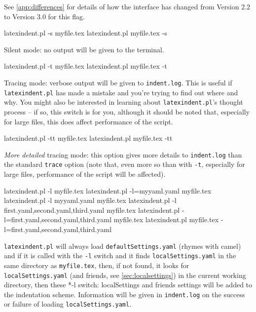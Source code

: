  See \vref{app:differences} for details of how the interface has changed from Version 2.2
 to Version 3.0 for this flag.  
 \begin{commandshell}
latexindent.pl -s myfile.tex
latexindent.pl myfile.tex -s
\end{commandshell}

 Silent mode: no output will be given to the terminal.

 \begin{commandshell}
latexindent.pl -t myfile.tex
latexindent.pl myfile.tex -t
\end{commandshell}

 \label{page:traceswitch}
 Tracing mode: verbose output will be given to \texttt{indent.log}. This is useful if
 \texttt{latexindent.pl} has made a mistake and you're trying to find out where and why.
 You might also be interested in learning about \texttt{latexindent.pl}'s thought process
 -- if so, this switch is for you, although it should be noted that, especially for large
 files, this does affect performance of the script.

 \begin{commandshell}
latexindent.pl -tt myfile.tex
latexindent.pl myfile.tex -tt
\end{commandshell}

 \emph{More detailed} tracing mode: this option gives more details to
 \texttt{indent.log}
 than the standard \texttt{trace} option (note that, even more so than with \texttt{-t},
 especially for large files, performance of the script will be affected).

 \begin{commandshell}
latexindent.pl -l myfile.tex
latexindent.pl -l=myyaml.yaml myfile.tex
latexindent.pl -l myyaml.yaml myfile.tex
latexindent.pl -l first.yaml,second.yaml,third.yaml myfile.tex
latexindent.pl -l=first.yaml,second.yaml,third.yaml myfile.tex
latexindent.pl myfile.tex -l=first.yaml,second.yaml,third.yaml 
\end{commandshell}

 \label{page:localswitch}
 \texttt{latexindent.pl} will always load \texttt{defaultSettings.yaml} (rhymes with
 camel) and if it is called with the \texttt{-l} switch and it finds
 \texttt{localSettings.yaml} in the same directory as \texttt{myfile.tex}, then, if not
 found, it looks for \texttt{localSettings.yaml} (and friends, see
 \vref{sec:localsettings}) in the current working directory, then
 these%
 *{-l switch: localSettings and
 friends} settings will be added to the indentation scheme. Information will be given in
 \texttt{indent.log} on the success or failure of loading \texttt{localSettings.yaml}.

